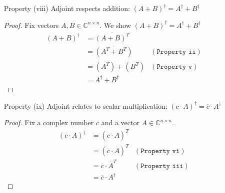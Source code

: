 \documentclass[11pt]{article}
\begin{document}
\begin{enumerate}
	\item[Property (viii)] Adjoint respects addition: 
		$(A+B)^{\dagger} = A^{\dagger} + B^{\dagger}$
	\begin{proof}
		Fix vectors $A,B \in \mathbb{C}^{n \times n}$. We show  
		$(A+B)^{\dagger} = A^{\dagger} + B^{\dagger}$
		\begin{align*}
			(A+B)^{\dagger} &= \overline{(A+B)^T} \\
					&= \overline{(A^T + B^T)} & (\texttt{Property ii}) \\
					&= \overline{(A^T)} + \overline{(B^T)}  & (\texttt{Property v}) \\ 
					&= A^{\dagger} + B^{\dagger}
		\end{align*}
	\end{proof}
	\item[Property (ix)] Adjoint relates to scalar multiplication: 
		$(c \cdot A)^{\dagger} = \overline{c} \cdot A^{\dagger}$
	\begin{proof}
		Fix a complex number $c$ and a vector $A \in \mathbb{C}^{n \times n}$. 
		\begin{align*}
			(c \cdot A)^{\dagger} &= (\overline{c \cdot A})^T \\
			&= (\overline{c} \cdot \overline{A})^T & (\texttt{Property vi}) \\
			&= \overline{c} \cdot \overline{A}^T & (\texttt{Property iii})  \\
			&= \overline{c} \cdot A^{\dagger}
		\end{align*}
	\end{proof}
\end{enumerate}

\end{document}
